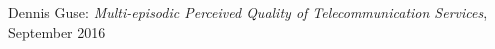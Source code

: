 \thispagestyle{empty}

\hfill

\vfill

\noindent{}Dennis Guse: \textit{Multi-episodic Perceived Quality of Telecommunication Services}, %
\textcopyright{} September 2016

%
%
%
%
%
